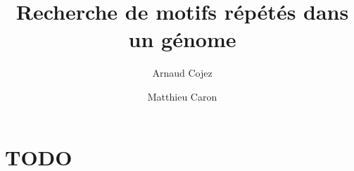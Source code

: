 \documentclass[a4paper,10pt]{report}
\title{Recherche de motifs répétés dans un génome}
\author{Arnaud Cojez \and Matthieu Caron}
\begin{document}
\maketitle

\chapter{TODO}
\end{document}
